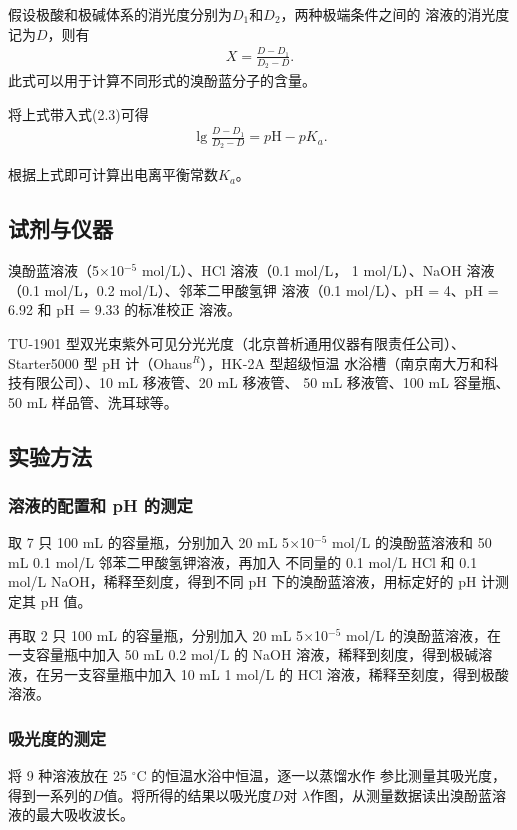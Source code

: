\documentclass[12pt]{ctexart}
\numberwithin{equation}{section}
\begin{document}
假设极酸和极碱体系的消光度分别为$D_1$和$D_2$，两种极端条件之间的
溶液的消光度记为$D$，则有
\begin{align}
    X = \frac{D - D_1}{D_2 - D}.
\end{align}
此式可以用于计算不同形式的溴酚蓝分子的含量。

将上式带入式(2.3)可得
\begin{align}
    \lg\frac{D - D_1}{D_2 - D} = p\mathrm{H} - p K_a.
\end{align}

根据上式即可计算出电离平衡常数$K_a$。

\subsection{试剂与仪器}

溴酚蓝溶液（5$\times$10$^{-5}$ mol/L）、HCl 溶液（0.1 mol/L，
1 mol/L）、NaOH 溶液（0.1 mol/L，0.2 mol/L）、邻苯二甲酸氢钾
溶液（0.1 mol/L）、pH = 4、pH = 6.92 和 pH = 9.33 的标准校正
溶液。

TU-1901 型双光束紫外可见分光光度（北京普析通用仪器有限责任公司）、
Starter5000 型 pH 计（Ohaus$^R$），HK-2A 型超级恒温
水浴槽（南京南大万和科技有限公司）、10 mL 移液管、20 mL 移液管、
50 mL 移液管、100 mL 容量瓶、50 mL 样品管、洗耳球等。

\subsection{实验方法}
\subsubsection{溶液的配置和 pH 的测定}

取 7 只 100 mL 的容量瓶，分别加入 20 mL 5$\times$10$^{-5}$
mol/L 的溴酚蓝溶液和 50 mL 0.1 mol/L 邻苯二甲酸氢钾溶液，再加入
不同量的 0.1 mol/L HCl 和 0.1 mol/L NaOH，稀释至刻度，得到不同
pH 下的溴酚蓝溶液，用标定好的 pH 计测定其 pH 值。

再取 2 只 100 mL 的容量瓶，分别加入 20 mL 5$\times$10$^{-5}$
mol/L 的溴酚蓝溶液，在一支容量瓶中加入 50 mL 0.2 mol/L 的 NaOH
溶液，稀释到刻度，得到极碱溶液，在另一支容量瓶中加入 10 mL 1 mol/L
的 HCl 溶液，稀释至刻度，得到极酸溶液。

\subsubsection{吸光度的测定}

将 9 种溶液放在 25 $^\circ$C 的恒温水浴中恒温，逐一以蒸馏水作
参比测量其吸光度，得到一系列的$D$值。将所得的结果以吸光度$D$对
$\lambda$作图，从测量数据读出溴酚蓝溶液的最大吸收波长。
\end{document}
